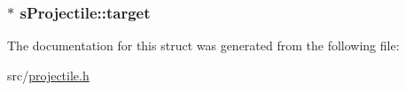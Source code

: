 \subsubsection[{target}]{$\ast$ s\+Projectile\+::target}\label{structs_projectile_a3b940e8b5370b3c328d2ed3d9924dc8d}


The documentation for this struct was generated from the following file\+:\begin{DoxyCompactItemize}
\item 
src/\hyperlink{projectile_8h}{projectile.\+h}\end{DoxyCompactItemize}
